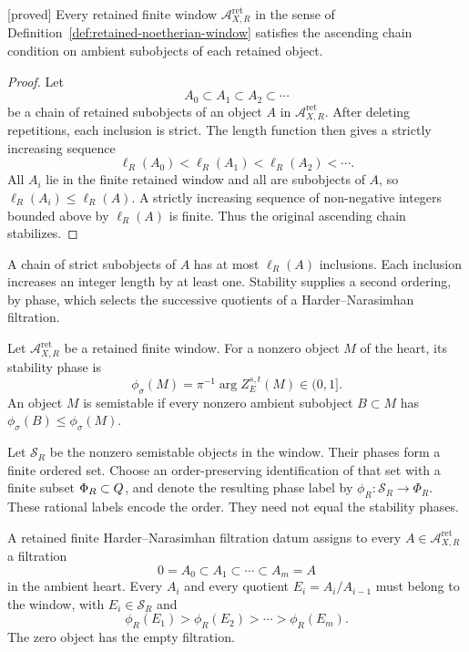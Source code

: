 \begin{proposition}
\label{prop:retained-window-noetherian}
\textnormal{[proved]}
Every retained finite window
\(\mathcal A_{X,R}^{\mathrm{ret}}\) in the sense of
Definition~\ref{def:retained-noetherian-window} satisfies the
ascending chain condition on ambient subobjects of each retained
object.
\end{proposition}

\begin{proof}
Let
\[
A_0\subset A_1\subset A_2\subset\cdots
\]
be a chain of retained subobjects of an object \(A\) in
\(\mathcal A_{X,R}^{\mathrm{ret}}\).  After deleting repetitions, each
inclusion is strict.  The length function then gives a strictly
increasing sequence
\[
\ell_R(A_0)<\ell_R(A_1)<\ell_R(A_2)<\cdots .
\]
All \(A_i\) lie in the finite retained window and all are subobjects of
\(A\), so \(\ell_R(A_i)\le \ell_R(A)\).  A strictly increasing sequence
of non-negative integers bounded above by \(\ell_R(A)\) is finite.
Thus the original ascending chain stabilizes.
\end{proof}

A chain of strict subobjects of \(A\) has at most \(\ell_R(A)\)
inclusions.  Each inclusion increases an integer length by at least
one.  Stability supplies a second ordering, by phase, which selects
the successive quotients of a Harder--Narasimhan filtration.

\begin{definition}
\label{def:retained-finite-hn-filtration-datum}
Let \(\mathcal A_{X,R}^{\mathrm{ret}}\) be a retained finite window.
For a nonzero object \(M\) of the heart, its stability phase is
\[
\phi_\sigma(M)=\pi^{-1}\arg Z_E^{s,t}(M)\in(0,1].
\]
An object \(M\) is semistable if every nonzero ambient subobject
\(B\subset M\) has \(\phi_\sigma(B)\le\phi_\sigma(M)\).

Let \(\mathcal S_R\) be the nonzero semistable objects in the
window.  Their phases form a finite ordered set.  Choose an
order-preserving identification of that set with a finite subset
\(\Phi_R\subset Q\), and denote the resulting phase label by
\(\phi_R:\mathcal S_R\to\Phi_R\).  These rational labels encode the order.  They need not equal the
stability phases.

A retained finite Harder--Narasimhan filtration datum assigns to
every \(A\in\mathcal A_{X,R}^{\mathrm{ret}}\) a filtration
\[
0=A_0\subset A_1\subset\cdots\subset A_m=A
\]
in the ambient heart.  Every \(A_i\) and every quotient
\(E_i=A_i/A_{i-1}\) must belong to the window, with
\(E_i\in\mathcal S_R\) and
\[
\phi_R(E_1)>\phi_R(E_2)>\cdots>\phi_R(E_m).
\]
The zero object has the empty filtration.
\end{definition}

